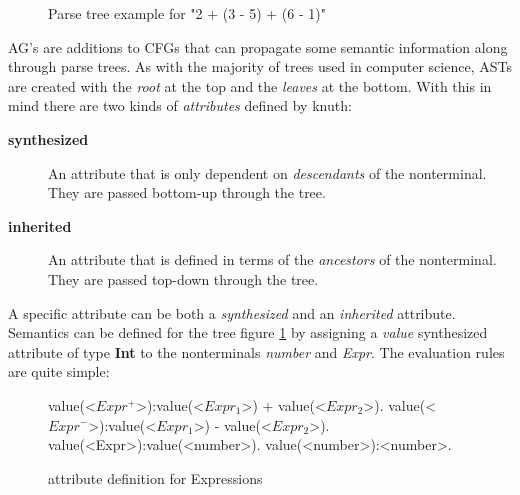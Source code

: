 \begin{figure}[H]
\centering
{}
\caption{Parse tree example for "2 + (3 - 5) + (6 - 1)"}
\label{fig.example1.parsetree}
\end{figure}

AG's are additions to CFGs that can propagate some semantic information along through parse trees. As with the majority of trees used in computer science, ASTs are created with the \emph{root} at the top and the \emph{leaves} at the bottom. With this in mind there are two kinds of \emph{attributes} defined by knuth\cite{knuth1}:
\begin{description}
\item[\textbf{synthesized}] An attribute that is only dependent on \emph{descendants} of the nonterminal. They are passed bottom-up through the tree.
\item[\textbf{inherited}] An attribute that is defined in terms of the \emph{ancestors} of the nonterminal. They are passed top-down through the tree.
\end{description}

A specific attribute can be both a \emph{synthesized} and an \emph{inherited} attribute.
Semantics can be defined for the tree figure \ref{fig.example1.parsetree} by assigning a \emph{value} synthesized attribute of type \textbf{Int} to the nonterminals \emph{number} and \emph{Expr}. The evaluation rules are quite simple:

\begin{figure}[H]
\begin{grammar}
value(<$Expr^+$>):value(<$Expr_1$>) + value(<$Expr_2$>). 
value(<$Expr^-$>):value(<$Expr_1$>) - value(<$Expr_2$>). 
value(<Expr>):value(<number>).
value(<number>):<number>.
\end{grammar}
\caption{attribute definition for Expressions}
\label{semantics:bnf:expr}
\end{figure}

